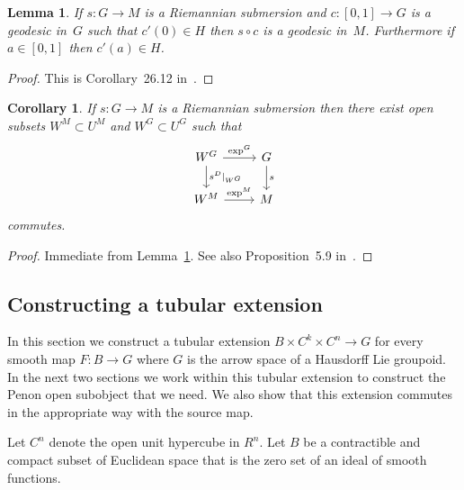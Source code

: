 \documentclass[pdftex]{sigma}
\numberwithin{equation}{section}
\newtheorem{Corollary}[Theorem]{Corollary}
\newtheorem{Lemma}[Theorem]{Lemma}
\begin{document}
\begin{Lemma}\label{lem:geodesics-preserved}
If $s\colon G \rightarrow M$ is a Riemannian submersion and $c\colon [0,1]\rightarrow G$ is a geodesic in~$G$ such that $c'(0)\in H$ then $s\circ c$ is a geodesic in~$M$. Furthermore if $a\in [0,1]$ then $c'(a)\in H$.
\end{Lemma}
\begin{proof}
This is Corollary~26.12 in~\cite{Michor2008}.
\end{proof}

\begin{Corollary}\label{exp-and-source}
If $s\colon G \rightarrow M$ is a Riemannian submersion then there exist open subsets $W^M\subset U^M$ and $W^G\subset U^G$ such that
\begin{equation*}
\begin{tikzcd}
W^G \rar{\exp^G} \dar{s^D|_{W^G}} & G \dar{s}\\
W^M \rar{\exp^M} & M
\end{tikzcd}
\end{equation*}
commutes.
\end{Corollary}
\begin{proof}
Immediate from Lemma~\ref{lem:geodesics-preserved}. See also Proposition~5.9 in~\cite{delHoyo2015}.
\end{proof}

\subsection{Constructing a tubular extension}\label{tubular-extension}

In this section we construct a tubular extension $B\times C^k\times C^n\rightarrow G$ for every smooth map $F\colon B\rightarrow G$ where $G$ is the arrow space of a Hausdorf\/f Lie groupoid. In the next two sections we work within this tubular extension to construct the Penon open subobject that we need. We also show that this extension commutes in the appropriate way with the source map.

\begin{Notation}Let $C^n$ denote the open unit hypercube in $R^n$. Let $B$ be a contractible and compact subset of Euclidean space that is the zero set of an ideal of smooth functions.
\end{Notation}
\end{document}
